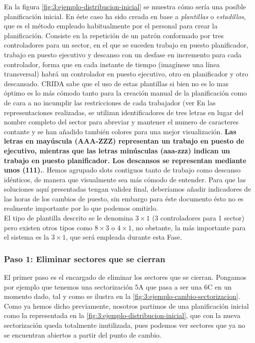 En la figura \autoref{fig:3:ejemplo-distribucion-inicial} se muestra cómo sería una posible planificación inicial. En éste caso ha sido creada en base a \textit{plantillas} o \textit{estadillos}, que es el método empleado habitualmente por el personal para crear la planificación. Consiste en la repetición de un patrón conformado por tres 
controladores para un sector, en el que se suceden trabajo en puesto planificador, trabajo en puesto ejecutivo y descanso con un desfase en incremento para cada controlador, forma que en cada instante de tiempo (imagínese una línea transversal) habrá un controlador en puesto ejecutivo, otro en planificador y otro descansado. \gls{CRIDA} sabe que el uso de estas plantillas si bien no es lo mas óptimo es lo más cómodo tanto para la creación manual de la planificación como de cara a no incumplir las restricciones de cada trabajador (ver %
En las representaciones realizadas, se utilizan identificadores de tres letras en lugar del nombre completo del sector para abreviar y mantener el numero de caracteres contante y se han añadido también colores para una mejor visualización.
\textbf{Las letras en mayúscula (AAA-ZZZ) representan un trabajo en puesto de ejecutivo, mientras que las letras minúsculas (aaa-zzz) indican un trabajo en puesto planificador. Los descansos se representan mediante unos (111).}.
Hemos agrupado slots contiguos tanto de trabajo como descanso idénticos, de manera que visualmente sea más cómodo de entender. Para que las soluciones aquí presentadas tengan validez final, deberíamos añadir indicadores de las horas de los cambios de puesto, sin embargo para éste documento ésto no es realmente importante por lo que podemos omitirlo.
\\

El tipo de plantilla descrito se le denomina $3\times1$ (3 controladores para 1 sector) pero existen otros tipos como $8\times3$ o $4\times1$, no obstante, la más importante para el sistema es la $3\times1$, que será empleada durante esta Fase.

\subsubsection{Paso 1: Eliminar sectores que se cierran}
El primer paso es el encargado de eliminar los sectores que se cierran. Pongamos por ejemplo que tenemos una 
sectorización 5A que pasa a ser una 6C en un momento dado, tal y como se ilustra en la 
\autoref{fig:3:ejemplo-cambio-sectorizacion}. Como ya hemos dicho previamente, nosotros partimos de una planificación inicial como la representada en la \autoref{fig:3:ejemplo-distribucion-inicial}, que con la nueva sectorización queda totalmente inutilizada, pues podemos ver sectores que ya no se encuentran abiertos a partir del punto de cambio.
\\

